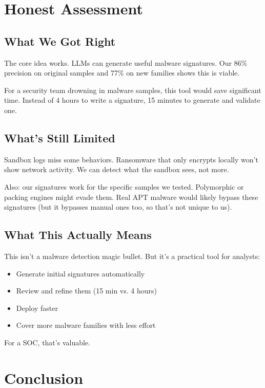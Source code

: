 \documentclass[11pt]{article}
\begin{document}
\section{Honest Assessment}

\subsection{What We Got Right}

The core idea works. LLMs can generate useful malware signatures. Our 86\% precision on original samples and 77\% on new families shows this is viable.

For a security team drowning in malware samples, this tool would save significant time. Instead of 4 hours to write a signature, 15 minutes to generate and validate one.

\subsection{What's Still Limited}

Sandbox logs miss some behaviors. Ransomware that only encrypts locally won't show network activity. We can detect what the sandbox sees, not more.

Also: our signatures work for the specific samples we tested. Polymorphic or packing engines might evade them. Real APT malware would likely bypass these signatures (but it bypasses manual ones too, so that's not unique to us).

\subsection{What This Actually Means}

This isn't a malware detection magic bullet. But it's a practical tool for analysts:
\begin{itemize}
    \item Generate initial signatures automatically
    \item Review and refine them (15 min vs. 4 hours)
    \item Deploy faster
    \item Cover more malware families with less effort
\end{itemize}

For a SOC, that's valuable.

\section{Conclusion}
\end{document}
